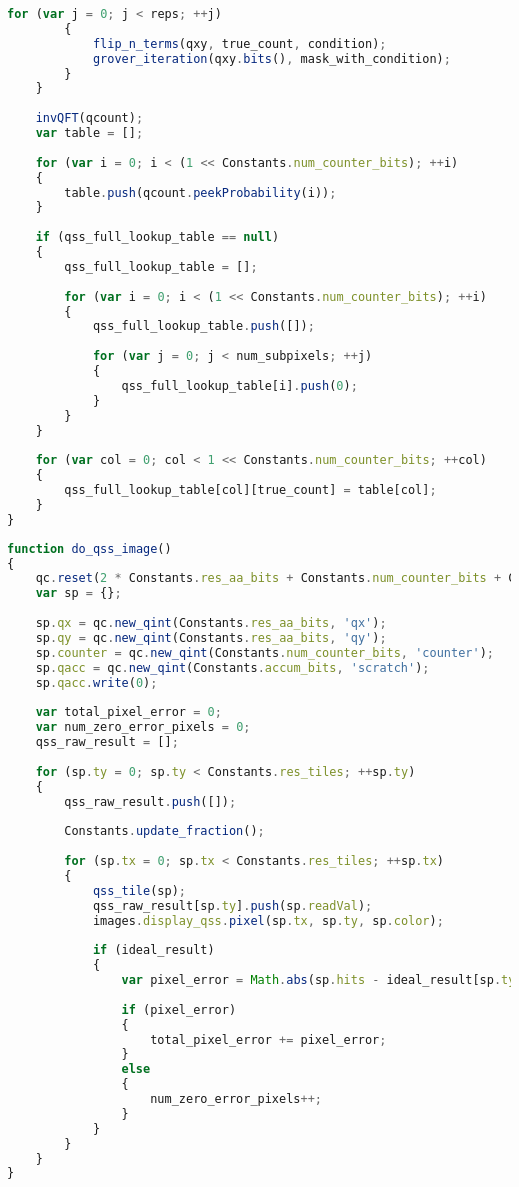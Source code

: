 \begin{lstlisting}[label=qtable,caption=Функция формирования квантовой поисковой таблицы, language=javascript]
		for (var j = 0; j < reps; ++j)
		{
			flip_n_terms(qxy, true_count, condition);
			grover_iteration(qxy.bits(), mask_with_condition);
		}
	}
	
	invQFT(qcount);
	var table = [];
	
	for (var i = 0; i < (1 << Constants.num_counter_bits); ++i)
	{
		table.push(qcount.peekProbability(i));
	}
	
	if (qss_full_lookup_table == null)
	{
		qss_full_lookup_table = [];
	
		for (var i = 0; i < (1 << Constants.num_counter_bits); ++i)
		{
			qss_full_lookup_table.push([]);
			
			for (var j = 0; j < num_subpixels; ++j)
			{
				qss_full_lookup_table[i].push(0);
			}
		}
	}
	
	for (var col = 0; col < 1 << Constants.num_counter_bits; ++col)
	{
		qss_full_lookup_table[col][true_count] = table[col];
	}
}
\end{lstlisting}

\begin{lstlisting}[label=qss,caption=Функция синтеза изображения на основе значений поисковой таблицы, language=javascript]
function do_qss_image()
{
	qc.reset(2 * Constants.res_aa_bits + Constants.num_counter_bits + Constants.accum_bits);
	var sp = {};
	
	sp.qx = qc.new_qint(Constants.res_aa_bits, 'qx');
	sp.qy = qc.new_qint(Constants.res_aa_bits, 'qy');
	sp.counter = qc.new_qint(Constants.num_counter_bits, 'counter');
	sp.qacc = qc.new_qint(Constants.accum_bits, 'scratch');
	sp.qacc.write(0);
	
	var total_pixel_error = 0;
	var num_zero_error_pixels = 0;
	qss_raw_result = [];
	
	for (sp.ty = 0; sp.ty < Constants.res_tiles; ++sp.ty)
	{
		qss_raw_result.push([]);
		
		Constants.update_fraction();
		
		for (sp.tx = 0; sp.tx < Constants.res_tiles; ++sp.tx)
		{
			qss_tile(sp);
			qss_raw_result[sp.ty].push(sp.readVal);
			images.display_qss.pixel(sp.tx, sp.ty, sp.color);
			
			if (ideal_result)
			{
				var pixel_error = Math.abs(sp.hits - ideal_result[sp.ty][sp.tx]);
			
				if (pixel_error)
				{
					total_pixel_error += pixel_error;
				}
				else
				{
					num_zero_error_pixels++;
				}
			}
		}
	}
}
\end{lstlisting}

